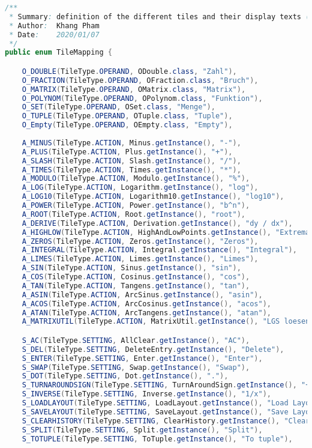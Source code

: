 \begin{lstlisting}[caption=TileMapping,label=list:TileMapping,language=Java]
/**
 * Summary: definition of the different tiles and their display texts (used for loading and saving)
 * Author:  Khang Pham
 * Date:    2020/01/07
 */
public enum TileMapping {

    O_DOUBLE(TileType.OPERAND, ODouble.class, "Zahl"),
    O_FRACTION(TileType.OPERAND, OFraction.class, "Bruch"),
    O_MATRIX(TileType.OPERAND, OMatrix.class, "Matrix"),
    O_POLYNOM(TileType.OPERAND, OPolynom.class, "Funktion"),
    O_SET(TileType.OPERAND, OSet.class, "Menge"),
    O_TUPLE(TileType.OPERAND, OTuple.class, "Tuple"),
    O_Empty(TileType.OPERAND, OEmpty.class, "Empty"),
    
    A_MINUS(TileType.ACTION, Minus.getInstance(), "-"),
    A_PLUS(TileType.ACTION, Plus.getInstance(), "+"),
    A_SLASH(TileType.ACTION, Slash.getInstance(), "/"),
    A_TIMES(TileType.ACTION, Times.getInstance(), "*"),
    A_MODULO(TileType.ACTION, Modulo.getInstance(), "%"),
    A_LOG(TileType.ACTION, Logarithm.getInstance(), "log"),
    A_LOG10(TileType.ACTION, Logarithm10.getInstance(), "log10"),
    A_POWER(TileType.ACTION, Power.getInstance(), "b^n"),
    A_ROOT(TileType.ACTION, Root.getInstance(), "root"),
    A_DERIVE(TileType.ACTION, Derivation.getInstance(), "dy / dx"),
    A_HIGHLOW(TileType.ACTION, HighAndLowPoints.getInstance(), "Extrema"),
    A_ZEROS(TileType.ACTION, Zeros.getInstance(), "Zeros"),
    A_INTEGRAL(TileType.ACTION, Integral.getInstance(), "Integral"),
    A_LIMES(TileType.ACTION, Limes.getInstance(), "Limes"),
    A_SIN(TileType.ACTION, Sinus.getInstance(), "sin"),
    A_COS(TileType.ACTION, Cosinus.getInstance(), "cos"),
    A_TAN(TileType.ACTION, Tangens.getInstance(), "tan"),
    A_ASIN(TileType.ACTION, ArcSinus.getInstance(), "asin"),
    A_ACOS(TileType.ACTION, ArcCosinus.getInstance(), "acos"),
    A_ATAN(TileType.ACTION, ArcTangens.getInstance(), "atan"),
    A_MATRIXUTIL(TileType.ACTION, MatrixUtil.getInstance(), "LGS loesen"),

    S_AC(TileType.SETTING, AllClear.getInstance(), "AC"),
    S_DEL(TileType.SETTING, DeleteEntry.getInstance(), "Delete"),
    S_ENTER(TileType.SETTING, Enter.getInstance(), "Enter"),
    S_SWAP(TileType.SETTING, Swap.getInstance(), "Swap"),
    S_DOT(TileType.SETTING, Dot.getInstance(), "."),
    S_TURNAROUNDSIGN(TileType.SETTING, TurnAroundSign.getInstance(), "+/-"),
    S_INVERSE(TileType.SETTING, Inverse.getInstance(), "1/x"),
    S_LOADLAYOUT(TileType.SETTING, LoadLayout.getInstance(), "Load Layout"),
    S_SAVELAYOUT(TileType.SETTING, SaveLayout.getInstance(), "Save Layout"),
    S_CLEARHISTORY(TileType.SETTING, ClearHistory.getInstance(), "Clear History"),
    S_SPLIT(TileType.SETTING, Split.getInstance(), "Split"),
    S_TOTUPLE(TileType.SETTING, ToTuple.getInstance(), "To tuple"),


\end{lstlisting}
